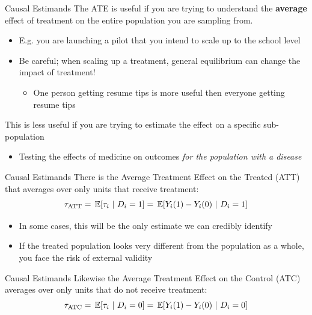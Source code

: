 \documentclass[aspectratio=169,t,11pt,table]{beamer}
\begin{document}
\begin{frame}{Causal Estimands}
  The ATE is useful if you are trying to understand the \textbf{average} effect of treatment on the entire population you are sampling from. 
  \begin{itemize}
    \item E.g. you are launching a pilot that you intend to scale up to the school level
    \pause
    \item Be careful; when scaling up a treatment, general equilibrium can change the impact of treatment! 
    \begin{itemize}
      \item One person getting resume tips is more useful then everyone getting resume tips
    \end{itemize}
  \end{itemize}

  \bigskip
  \pause
  This is less useful if you are trying to estimate the effect on a specific sub-population 
  \begin{itemize}
    \item Testing the effects of medicine on outcomes \emph{for the population with a disease}
  \end{itemize}
\end{frame}


\begin{frame}{Causal Estimands}
  There is the \alert{Average Treatment Effect on the Treated} (ATT) that averages over only units that receive treatment:
  $$
    \tau_{\text{ATT}} = \expec{\tau_i}{D_i = 1} = \expec{Y_i(1) - Y_i(0)}{D_i = 1}
  $$

  \bigskip
  \begin{itemize}
    \item In some cases, this will be the only estimate we can credibly identify
    
    \item If the treated population looks very different from the population as a whole, you face the risk of \alert{external validity} 
  \end{itemize}
\end{frame}

\begin{frame}{Causal Estimands}
  Likewise the \alert{Average Treatment Effect on the Control} (ATC) averages over only units that do not receive treatment:
  $$
    \tau_{\text{ATC}} = \expec{\tau_i}{D_i = 0} = \expec{Y_i(1) - Y_i(0)}{D_i = 0}
  $$
\end{frame}
\end{document}
